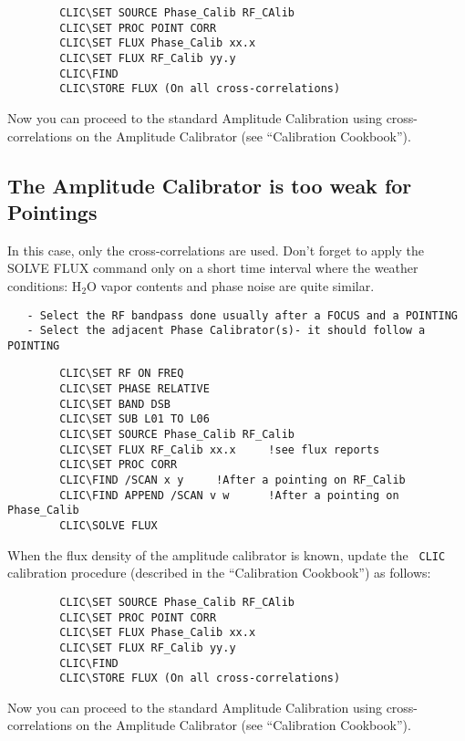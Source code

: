 \documentclass[11pt]{article}
\begin{document}
\begin{verbatim}
        CLIC\SET SOURCE Phase_Calib RF_CAlib
        CLIC\SET PROC POINT CORR
        CLIC\SET FLUX Phase_Calib xx.x
        CLIC\SET FLUX RF_Calib yy.y
        CLIC\FIND 
        CLIC\STORE FLUX (On all cross-correlations) 
\end{verbatim}  
Now you can proceed to the standard Amplitude Calibration using
cross-correlations on the Amplitude Calibrator (see ``Calibration
Cookbook'').

\subsection{The Amplitude Calibrator is too weak for Pointings}

In this case, only the cross-correlations are used.  Don't forget to apply
the SOLVE FLUX command only on a short time interval where the weather
conditions: H$_2$O vapor contents and phase noise are quite similar.

\begin{verbatim}
   - Select the RF bandpass done usually after a FOCUS and a POINTING 
   - Select the adjacent Phase Calibrator(s)- it should follow a POINTING
\end{verbatim}

\begin{verbatim}
        CLIC\SET RF ON FREQ
        CLIC\SET PHASE RELATIVE
        CLIC\SET BAND DSB
        CLIC\SET SUB L01 TO L06
        CLIC\SET SOURCE Phase_Calib RF_Calib
        CLIC\SET FLUX RF_Calib xx.x     !see flux reports
        CLIC\SET PROC CORR
        CLIC\FIND /SCAN x y     !After a pointing on RF_Calib
        CLIC\FIND APPEND /SCAN v w      !After a pointing on Phase_Calib
        CLIC\SOLVE FLUX 
\end{verbatim}

When the flux density of the amplitude calibrator is known, update the {\tt
  CLIC} calibration procedure (described in the ``Calibration Cookbook'')
as follows:

\begin{verbatim}
        CLIC\SET SOURCE Phase_Calib RF_CAlib
        CLIC\SET PROC POINT CORR
        CLIC\SET FLUX Phase_Calib xx.x
        CLIC\SET FLUX RF_Calib yy.y
        CLIC\FIND 
        CLIC\STORE FLUX (On all cross-correlations) 
\end{verbatim} 
 
Now you can proceed to the standard Amplitude Calibration using
cross-correlations on the Amplitude Calibrator (see ``Calibration
Cookbook'').
\end{document}
